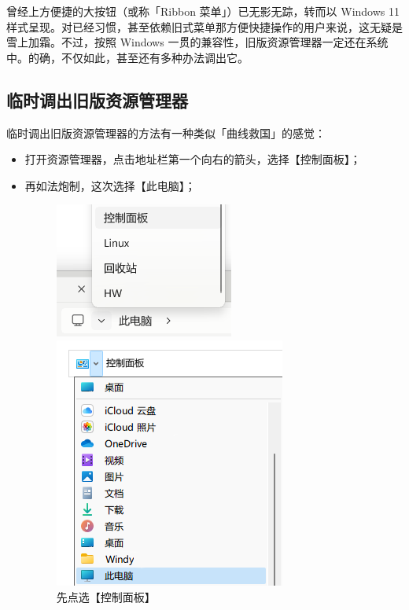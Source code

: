 曾经上方便捷的大按钮（或称「Ribbon 菜单」）已无影无踪，转而以 Windows 11 样式呈现。对已经习惯，甚至依赖旧式菜单那方便快捷操作的用户来说，这无疑是雪上加霜。不过，按照 Windows 一贯的兼容性，旧版资源管理器一定还在系统中。的确，不仅如此，甚至还有多种办法调出它。

\subsection{临时调出旧版资源管理器}

临时调出旧版资源管理器的方法有一种类似「曲线救国」的感觉：

\begin{itemize}
  \item 打开资源管理器，点击地址栏第一个向右的箭头，选择【控制面板】；
  \item 再如法炮制，这次选择【此电脑】；
    \begin{figure}[htb!]
      \begin{minipage}{.49\textwidth}
        \centering
        \includegraphics[width=.6\textwidth]{assets/advanced/go-to-control.png}
        \caption{先点选【控制面板】}
        \label{fig:go-to-control}
      \end{minipage}
      \begin{minipage}{.49\textwidth}
        \centering
        \includegraphics[width=.8\textwidth]{assets/advanced/back-to-this-pc.png}

\end{minipage}
\end{figure}
\end{itemize}
